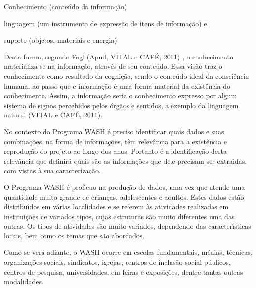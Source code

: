 \documentclass[
12pt,		%
openright,	%
twoside,  %
a4paper,			%
chapter=TITLE,		%
english,			%
french,				%
spanish,			%
brazil				%
]{USPSC-classe/USPSC}
\begin{document}
\begin{alineas}
\item Conhecimento (conte\'udo da informa\c{c}\~ao)
\item linguagem (um instrumento de express\~ao de itens de informa\c{c}\~ao) e
\item suporte (objetos, materiais e energia)
\end{alineas}

Desta forma, segundo Fogl  (Apud, VITAL e CAF\'E, 2011) , \textquotedbl o conhecimento materializa-se na informa\c{c}\~ao, atrav\'es de seu conte\'udo\textquotedbl . Essa vis\~ao traz o conhecimento como resultado da cogni\c{c}\~ao, sendo \textquotedbl o conte\'udo ideal da consci\^encia humana\textquotedbl , ao passo que e informa\c{c}\~ao \'e uma forma material da exist\^encia do conhecimento. Assim, a informa\c{c}\~ao seria o conhecimento expresso por algum \textquotedbl sistema de signos percebidos pelos \'org\~aos e sentidos\textquotedbl , a exemplo da linguagem natural  (VITAL e CAF\'E, 2011).









No contexto do Programa WASH \'e preciso identificar quais dados e suas combina\c{c}\~oes, na forma de informa\c{c}\~oes, t\^em relev\^ancia para a exist\^encia e reprodu\c{c}\~ao do projeto ao longo dos anos. Portanto \'e a identifica\c{c}\~ao desta relev\^ancia que definir\'a quais s\~ao as informa\c{c}\~oes que dele precisam ser extra\'{\i}das, com vistas \`a sua caracteriza\c{c}\~ao.









O Programa WASH \'e prof\'{\i}cuo na produ\c{c}\~ao de dados, uma vez que atende uma quantidade muito grande de crian\c{c}as, adolescentes e adultos. Estes dados est\~ao distribu\'{\i}dos em v\'arias localidades e se referem \`as atividades realizadas em institui\c{c}\~oes de variados tipos, cujas estruturas s\~ao muito diferentes uma das outras. Os tipos de atividades s\~ao muito variados, dependendo das caracter\'{\i}sticas locais, bem como os temas que s\~ao abordados.









Como se ver\'a adiante, o WASH ocorre  em escolas fundamentais, m\'edias, t\'ecnicas, organiza\c{c}\~oes sociais, sindicatos, igrejas, centros de inclus\~ao social p\'ublicos, centros de pesquisa, universidades, em feiras e exposi\c{c}\~oes, dentre tantas outras modalidades.
\end{document}
